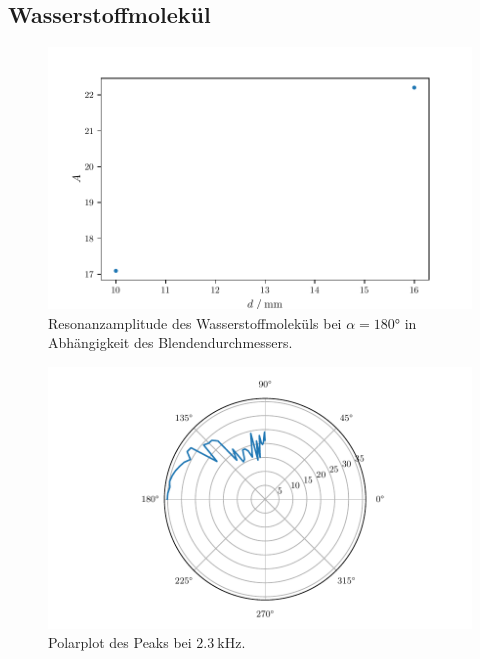 \subsection{Wasserstoffmolekül}
\begin{figure}
    \centering
    \includegraphics{build/h2dia.pdf}
    \caption{Resonanzamplitude des Wasserstoffmoleküls bei $\alpha = \ang{180}$ in Abhängigkeit des Blendendurchmessers.}
    \label{fig:h9ring}
\end{figure}
\begin{figure}
    \centering
    \includegraphics{build/h2varangle.pdf}
    \caption{Polarplot des Peaks bei $\qty{2.3}{\kilo\hertz}$.}
    \label{fig:h9ring}
\end{figure}
